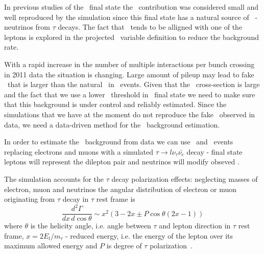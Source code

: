 In previous studies of the \WW\ final state the \dytt\ contribution
was considered small and well reproduced by the simulation since this
final state has a natural source of \met\ - neutrinos from $\tau$
decays. The fact that \met\ tends to be alligned with one of the
leptons is explored in the projected \met\ variable definition to
reduce the background rate.

With a rapid increase in the number of multiple interactions per bunch
crossing in 2011 data the situation is changing. Large amount of
pileup may lead to fake \met\ that is larger than the natural \met\
in \dytt\ events. Given that the \dytt\ cross-section is large and the
fact that we use a lower \met\ threshold in \emu\ final state we need
to make sure that this background is under control and reliably
estimated. Since the simulations that we have at the moment do not
reproduce the fake \met\ observed in data, we need a data-driven
method for the \dytt\ background estimation.

In order to estimate the \dytt\ background from data we can use \zee\
and \zmm\ events replacing electrons and muons with a simulated
$\tau\to l\nu_\tau\bar{\nu_e}$ decay - final state leptons will
represent the dilepton pair and neutrinos will modify obseved \met{}.

The simulation accounts for the $\tau$ decay polarization effects:
neglecting masses of electron, muon and neutrinos the angular
distribution of electron or muon originating from $\tau$ decay in
$\tau$ rest frame is
\begin{equation}
        \frac{d^2\Gamma}{dx\,d\cos\theta}\sim x^2(3-2x \pm P\cos\theta(2x-1))
\end{equation}
where $\theta$ is the helicity angle, i.e. angle between $\tau$ and
lepton direction in $\tau$ rest frame, $x=2E_l/m_\tau$ - reduced
energy, i.e. the energy of the lepton over its maximum allowed energy
and $P$ is degree of $\tau$ polarization~\cite{pdg}.




